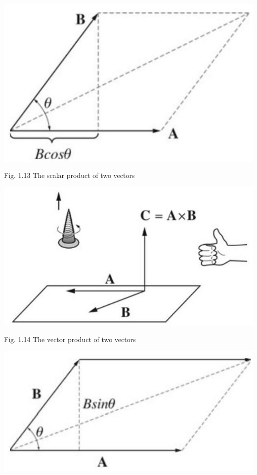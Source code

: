 \documentclass[10pt]{article}
\begin{document}
\begin{center}
\includegraphics[max width=\textwidth]{2024_09_13_db1f357d2aad0a03eb2eg-016(3)}
\end{center}

Fig. 1.13 The scalar product of two vectors

\begin{center}
\includegraphics[max width=\textwidth]{2024_09_13_db1f357d2aad0a03eb2eg-017(2)}
\end{center}

Fig. 1.14 The vector product of two vectors

\begin{center}
\includegraphics[max width=\textwidth]{2024_09_13_db1f357d2aad0a03eb2eg-017}
\end{center}
\end{document}

